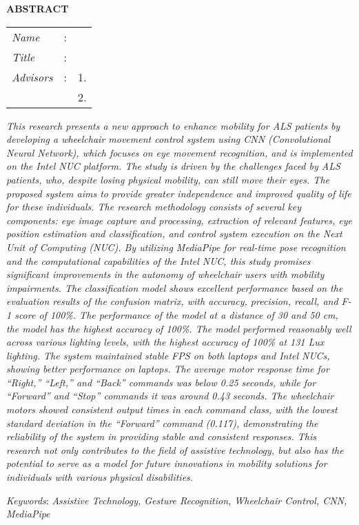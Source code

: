 \begin{center}
  \large\textbf{ABSTRACT}
\end{center}


\vspace{2ex}

\begingroup
\setlength{\tabcolsep}{0pt}

\noindent
\begin{tabularx}{\textwidth}{l >{\centering}m{3em} X}
  \emph{Name}     & : & \name{}         \\

  \emph{Title}    & : & \engtatitle{}   \\

  \emph{Advisors} & : & 1. \advisor{}   \\
                  &   & 2. \coadvisor{} \\
\end{tabularx}
\endgroup

\emph{This research presents a new approach to enhance mobility for ALS patients by developing a wheelchair movement control system using CNN (Convolutional Neural Network), which focuses on eye movement recognition, and is implemented on the Intel NUC platform. The study is driven by the challenges faced by ALS patients, who, despite losing physical mobility, can still move their eyes. The proposed system aims to provide greater independence and improved quality of life for these individuals. The research methodology consists of several key components: eye image capture and processing, extraction of relevant features, eye position estimation and classification, and control system execution on the Next Unit of Computing (NUC). By utilizing MediaPipe for real-time pose recognition and the computational capabilities of the Intel NUC, this study promises significant improvements in the autonomy of wheelchair users with mobility impairments. The classification model shows excellent performance based on the evaluation results of the confusion matrix, with accuracy, precision, recall, and F-1 score of 100\%. The performance of the model at a distance of 30 and 50 cm, the model has the highest accuracy of 100\%. The model performed reasonably well across various lighting levels, with the highest accuracy of 100\% at 131 Lux lighting. The system maintained stable FPS on both laptops and Intel NUCs, showing better performance on laptops. The average motor response time for “Right,” “Left,” and “Back” commands was below 0.25 seconds, while for “Forward” and “Stop” commands it was around 0.43 seconds. The wheelchair motors showed consistent output times in each command class, with the lowest standard deviation in the “Forward” command (0.117), demonstrating the reliability of the system in providing stable and consistent responses. This research not only contributes to the field of assistive technology, but also has the potential to serve as a model for future innovations in mobility solutions for individuals with various physical disabilities.}

\emph{Keywords}: \emph{Assistive Technology, Gesture Recognition, Wheelchair Control, CNN, MediaPipe}